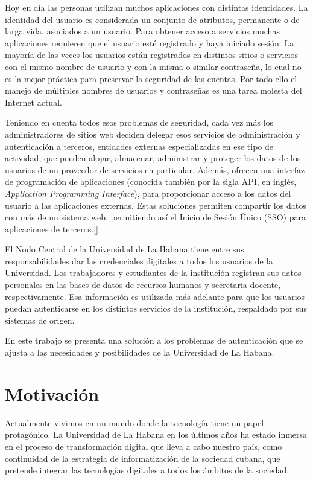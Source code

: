 Hoy en día las personas utilizan muchos aplicaciones con distintas identidades. La identidad del usuario es considerada un conjunto de atributos, permanente o de larga vida, asociados a un usuario. Para obtener acceso a servicios muchas aplicaciones requieren que el usuario esté registrado y haya iniciado sesión. La mayoría de las veces los usuarios están registrados en distintos sitios o servicios con el mismo nombre de usuario y con la misma o similar contraseña, lo cual no es la mejor práctica para preservar la seguridad de las cuentas. Por todo ello el manejo de múltiples nombres de usuarios y contraseñas es una tarea molesta del Internet actual.

Teniendo en cuenta todos esos problemas de seguridad, cada vez más los administradores de sitios web deciden delegar esos servicios de administración y autenticación a terceros, entidades externas especializadas en ese tipo de actividad, que pueden alojar, almacenar, administrar y proteger los datos de los usuarios de un proveedor de servicios en particular. Además, ofrecen una interfaz de programación de aplicaciones (conocida también por la sigla API, en inglés, \textit{Application Programming Interface}), para proporcionar acceso a los datos del usuario a las aplicaciones externas. Estas soluciones permiten compartir los datos con más de un sistema web, permitiendo así el Inicio de Sesión Único (SSO) para aplicaciones de terceros.[\cite{kutera2016single}]

El Nodo Central de la Universidad de La Habana tiene entre sus responsabilidades dar las credenciales digitales a todos los usuarios de la Universidad. Los trabajadores y estudiantes de la institución registran sus datos personales en las bases de datos de recursos humanos y secretaria docente, respectivamente. Esa información es utilizada más adelante para que los usuarios puedan autenticarse en los distintos servicios de la institución, respaldado por sus sistemas de origen.

En este trabajo se presenta una solución a los problemas de autenticación que se ajusta a las necesidades y posibilidades de la Universidad de La Habana.  

\section*{Motivación}
Actualmente vivimos en un mundo donde la tecnología tiene un papel protagónico. La Universidad de La Habana en los últimos años ha estado inmersa en el proceso de transformación digital que lleva a cabo nuestro país, como continuidad de la estrategia de informatización de la sociedad cubana, que pretende integrar las tecnologías digitales a todos los ámbitos de la sociedad.

